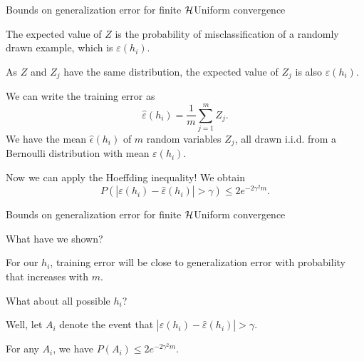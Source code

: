 \documentclass{beamer}
\begin{document}
\begin{frame}{Bounds on generalization error for finite $\cal H$}{Uniform convergence}

  The expected value of $Z$ is the probability of misclassification of
  a randomly drawn example, which is $\varepsilon(h_i)$.

  \medskip

  As $Z$ and $Z_j$ have the same distribution, the expected value of $Z_j$
  is also $\varepsilon(h_i)$.

  \medskip

  We can write the training error as
  \[ \hat{\varepsilon}(h_i) = \frac{1}{m} \sum_{j=1}^m Z_j .\]
  We have the mean $\hat{\epsilon}(h_i)$ of $m$ random variables $Z_j$,
  all drawn i.i.d. from a Bernoulli distribution with mean
  $\varepsilon(h_i)$.

  \medskip

  Now we can apply the Hoeffding inequality! We obtain
  \[ P(|\varepsilon(h_i)-\hat{\varepsilon}(h_i)| > \gamma) \le 2 e^{-2\gamma^2m} .\]

\end{frame}


\begin{frame}{Bounds on generalization error for finite $\cal H$}{Uniform convergence}

  What have we shown?

  \medskip

  For our $h_i$, \alert{training error will be close to generalization
    error} with probability that increases with $m$.

  \medskip

  What about \alert{all possible $h_i$}?

  \medskip

  Well, let $A_i$ denote the event that $|\varepsilon(h_i)-\hat{\varepsilon}(h_i)| > \gamma$.

  \medskip

  For any $A_i$, we have $P(A_i) \le 2 e^{-2\gamma^2m}$.
  
\end{frame}
\end{document}

